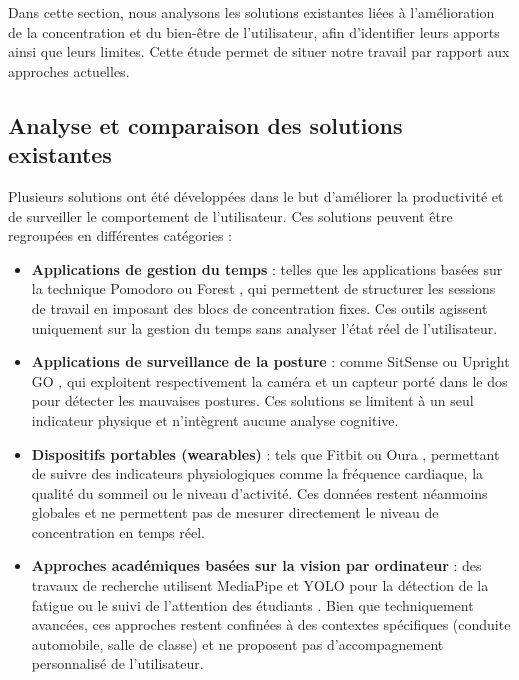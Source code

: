 Dans cette section, nous analysons les solutions existantes liées à l'amélioration de la concentration et du bien-être de l'utilisateur, afin d'identifier leurs apports ainsi que leurs limites. Cette étude permet de situer notre travail par rapport aux approches actuelles.

\subsection{Analyse et comparaison des solutions existantes}

Plusieurs solutions ont été développées dans le but d’améliorer la productivité et de surveiller le comportement de l’utilisateur. Ces solutions peuvent être regroupées en différentes catégories :

\begin{itemize}
    \item \textbf{Applications de gestion du temps} : telles que les applications basées sur la technique Pomodoro \cite{pomodoro} ou Forest \cite{forest}, qui permettent de structurer les sessions de travail en imposant des blocs de concentration fixes. Ces outils agissent uniquement sur la gestion du temps sans analyser l’état réel de l’utilisateur.

    \item \textbf{Applications de surveillance de la posture} : comme SitSense \cite{sitsense} ou Upright GO \cite{uprightgo}, qui exploitent respectivement la caméra et un capteur porté dans le dos pour détecter les mauvaises postures. Ces solutions se limitent à un seul indicateur physique et n’intègrent aucune analyse cognitive.

    \item \textbf{Dispositifs portables (wearables)} : tels que Fitbit \cite{fitbit} ou Oura \cite{oura}, permettant de suivre des indicateurs physiologiques comme la fréquence cardiaque, la qualité du sommeil ou le niveau d’activité. Ces données restent néanmoins globales et ne permettent pas de mesurer directement le niveau de concentration en temps réel.

    \item \textbf{Approches académiques basées sur la vision par ordinateur} : des travaux de recherche utilisent MediaPipe \cite{mediapipe} et YOLO \cite{yolo} pour la détection de la fatigue \cite{fatiguedetection} ou le suivi de l’attention des étudiants \cite{studentattention}. Bien que techniquement avancées, ces approches restent confinées à des contextes spécifiques (conduite automobile, salle de classe) et ne proposent pas d’accompagnement personnalisé de l’utilisateur.
\end{itemize}

